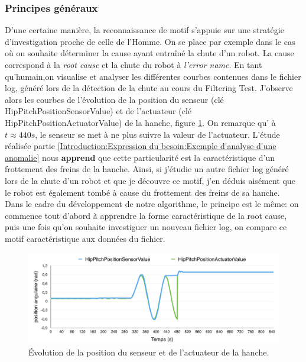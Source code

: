 \subsubsection{Principes généraux}
\label{Automatisation du processus d'investigation: Reconnaissance de motifs: Principes généraux}
D'une certaine manière, la reconnaissance de motif s'appuie sur une stratégie d'investigation proche de celle de l'Homme. On se place par exemple dans le cas où on souhaite déterminer la cause ayant entraîné la chute d'un robot. La cause correspond à la \emph{root cause} et la chute du robot à \emph{l'error name}. En tant qu'humain,on visualise et analyser les différentes courbes contenues dans le fichier log, généré lors de la détection de la chute au cours du Filtering Test. J'observe alors les courbes de l'évolution de la position du senseur (clé HipPitchPositionSensorValue) et de l'actuateur (clé HipPitchPositionActuatorValue) de la hanche, figure \ref{fig:Évolution de la position du senseur et de l'actuateur de la hanche}. On remarque qu' à $t \approx 440 s$, le senseur se met à ne plus suivre la valeur de l'actuateur. L'étude réalisée partie \ref{Introduction:Expression du besoin:Exemple d'analyse d'une anomalie} nous \textbf{apprend} que cette particularité est la caractéristique d'un frottement des freins de la hanche. Ainsi, si j'étudie un autre fichier log généré lors de la chute d'un robot et que je découvre ce motif, j'en déduis aisément que le robot est également tombé à cause du frottement des freins de sa hanche. \\
Dans le cadre du développement de notre algorithme, le principe est le même: on commence tout d'abord à apprendre la forme caractéristique de la root cause, puis une fois qu'on souhaite investiguer un nouveau fichier log, on compare ce motif caractéristique aux données du fichier. 

\begin{figure}[H]
	\centering\includegraphics[width=12cm]{images/HipPitch.png}
	\caption[Évolution de la position du senseur et de l'actuateur de la hanche]{Évolution de la position du senseur et de l'actuateur de la hanche.}
	\label{fig:Évolution de la position du senseur et de l'actuateur de la hanche}
\end{figure}

